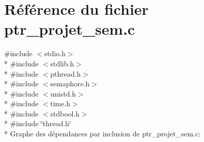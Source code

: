 \section{Référence du fichier ptr\+\_\+projet\+\_\+sem.\+c}
\label{ptr__projet__sem_8c}
{\ttfamily \#include $<$stdio.\+h$>$}\\*
{\ttfamily \#include $<$stdlib.\+h$>$}\\*
{\ttfamily \#include $<$pthread.\+h$>$}\\*
{\ttfamily \#include $<$semaphore.\+h$>$}\\*
{\ttfamily \#include $<$unistd.\+h$>$}\\*
{\ttfamily \#include $<$time.\+h$>$}\\*
{\ttfamily \#include $<$stdbool.\+h$>$}\\*
{\ttfamily \#include \char`\"{}thread.\+h\char`\"{}}\\*
Graphe des dépendances par inclusion de ptr\+\_\+projet\+\_\+sem.\+c\+:
